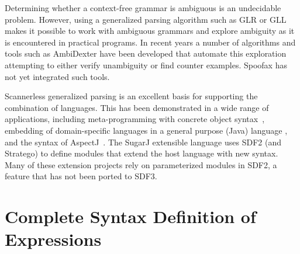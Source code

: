 Determining whether a context-free grammar is ambiguous is an undecidable
problem. However, using a generalized parsing algorithm such as GLR or GLL makes
it possible to work with ambiguous grammars and explore ambiguity as it is
encountered in practical programs. In recent years a number of algorithms and
tools such as AmbiDexter \cite{BastenS10} have been developed that automate this
exploration attempting to either verify unambiguity or find counter examples.
Spoofax has not yet integrated such tools. 

Scannerless generalized parsing is an excellent basis for supporting the
combination of languages. This has been demonstrated in a wide range of applications,
including meta-programming with concrete object syntax~\cite{Visser02},
embedding of domain-specific languages in a general purpose (Java) language
\cite{BravenboerV04}, and the syntax of AspectJ~\cite{BravenboerTV06}.
The SugarJ extensible language \cite{ErdwegRKO11} uses SDF2 (and Stratego) to
define modules that extend the host language with new syntax. 
Many of these extension projects rely on parameterized modules in SDF2, a
feature that has not been ported to SDF3.

\newpage
\section{Complete Syntax Definition of Expressions}

